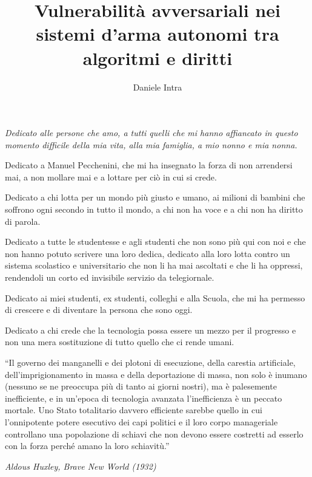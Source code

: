 \ifstampa\documentclass[a4paper,12pt,twoside,openright]{report}\else\documentclass[a4paper,12pt]{report}\fi
\makeatletter
\def\@sottotitolo{}
\newcommand{\sottotitolo}[1]{\gdef\@sottotitolo{#1}}
\makeatother
\begin{document}
\title{Vulnerabilità avversariali nei sistemi d'arma autonomi tra algoritmi e diritti}
\sottotitolo{Un'analisi sperimentale sulla robustezza della computer vision, implicazioni per il principio di distinzione e per il controllo umano}
\author{Daniele Intra}

\beforepreface

\begin{flushright}
\begin{minipage}{1\textwidth}
\Large\sl
Dedicato alle persone che amo, a tutti quelli che mi hanno affiancato in questo momento difficile della mia vita, alla mia famiglia, a mio nonno e mia nonna.

Dedicato a Manuel Pecchenini, che mi ha insegnato la forza di non arrendersi mai, a non mollare mai e a lottare per ciò in cui si crede.

Dedicato a chi lotta per un mondo più giusto e umano, ai milioni di bambini che soffrono ogni secondo in tutto il mondo, a chi non ha voce e a chi non ha diritto di parola.

Dedicato a tutte le studentesse e agli studenti che non sono più qui con noi e che non hanno potuto scrivere una loro dedica, dedicato alla loro lotta contro un sistema scolastico e universitario che non li ha mai ascoltati e che li ha oppressi, rendendoli un corto ed invisibile servizio da telegiornale.

Dedicato ai miei studenti, ex studenti, colleghi e alla Scuola, che mi ha permesso di crescere e di diventare la persona che sono oggi.

Dedicato a chi crede che la tecnologia possa essere un mezzo per il progresso e non una mera sostituzione di tutto quello che ci rende umani.
\end{minipage}
\end{flushright}

\begin{flushright}
\begin{minipage}{0.6\textwidth}
\epigraph{
    ``Il governo dei manganelli e dei plotoni di esecuzione, della carestia artificiale, dell'imprigionamento in massa e della deportazione di massa, non solo è inumano (nessuno se ne preoccupa più di tanto ai giorni nostri), ma è palesemente inefficiente, e in un'epoca di tecnologia avanzata l'inefficienza è un peccato mortale. Uno Stato totalitario davvero efficiente sarebbe quello in cui l'onnipotente potere esecutivo dei capi politici e il loro corpo manageriale controllano una popolazione di schiavi che non devono essere costretti ad esserlo con la forza perché amano la loro schiavitù.''
}{\textit{Aldous Huxley, Brave New World (1932)}}
\end{minipage}
\end{flushright}
\end{document}
